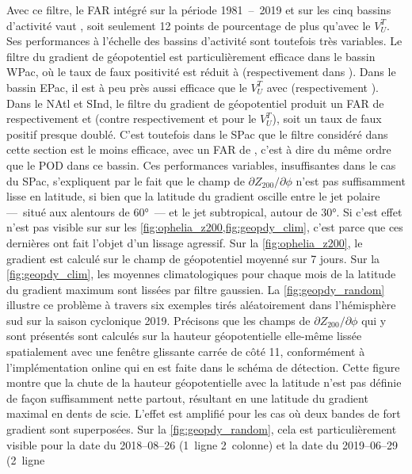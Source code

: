 \documentclass[../main.tex]{subfiles}
\begin{document}
Avec ce filtre, le FAR intégré sur la période \num{1981}~--~\num{2019} et sur les cinq bassins d'activité vaut , soit seulement 12 points de
pourcentage de plus qu'avec le $V_U^T$. Ses performances à l'échelle des bassins d'activité sont toutefois très variables. Le filtre du gradient de géopotentiel
est particulièrement efficace dans le bassin WPac, où le taux de faux positivité est réduit à  (respectivement  dans
\textcite{dulac_assessing_2023}). Dans le bassin EPac, il est à peu près aussi efficace que le $V_U^T$ avec  (respectivement ). Dans le NAtl et
SInd, le filtre du gradient de géopotentiel produit un FAR de respectivement  et  (contre respectivement  et  pour le
$V_U^T$), soit un taux de faux positif presque doublé. C'est toutefois dans le SPac que le filtre considéré dans cette section est le moins efficace, avec un
FAR de , c'est à dire du même ordre que le POD dans ce bassin. Ces performances variables, insuffisantes dans le cas du SPac, s'expliquent par le fait
que le champ de $\partial Z_{200} / \partial \phi$ n'est pas suffisamment lisse en latitude, si bien que la latitude du gradient oscille entre le jet polaire
---~situé aux alentours de \ang{60}~--- et le jet subtropical, autour de \ang{30}. Si c'est effet n'est pas visible sur sur les
\cref{fig:ophelia_z200,fig:geopdy_clim}, c'est parce que ces dernières ont fait l'objet d'un lissage agressif. Sur la \cref{fig:ophelia_z200}, le gradient est
calculé sur le champ de géopotentiel moyenné sur \num{7} jours. Sur la \cref{fig:geopdy_clim}, les moyennes climatologiques pour chaque mois de la latitude du
gradient maximum sont lissées par filtre gaussien. La \cref{fig:geopdy_random} illustre ce problème à travers six exemples tirés aléatoirement dans l'hémisphère
sud sur la saison cyclonique 2019. Précisons que les champs de $\partial Z_{200} / \partial \phi$ qui y sont présentés sont calculés sur la hauteur
géopotentielle elle-même lissée spatialement avec une fenêtre glissante carrée de côté 11, conformément à l'implémentation online qui en est faite dans le
schéma de détection. Cette figure montre que la chute de la hauteur géopotentielle avec la latitude n'est pas définie de façon suffisamment nette partout,
résultant en une latitude du gradient maximal en dents de scie. L'effet est amplifié pour les cas où deux bandes de fort gradient sont superposées. Sur la
\cref{fig:geopdy_random}, cela est particulièrement visible pour la date du 2018--08--26 (1\iere~ligne 2\ieme~colonne) et la date du 2019--06--29 (2\ieme~ligne
\end{document}
